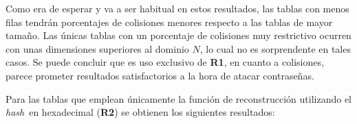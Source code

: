 \documentclass[12pt,spanish,listoffigures,listoftables]{tfgetsinf}
\newcommand{\hash}{\textit{hash}}
\begin{document}
Como era de esperar y va a ser habitual en estos resultados, las tablas con menos filas tendrán porcentajes de colisiones menores respecto a las tablas de mayor tamaño. Las únicas tablas con un porcentaje de colisiones muy restrictivo ocurren con unas dimensiones superiores al dominio $N$, lo cual no es sorprendente en tales casos. Se puede concluir que es uso exclusivo de \textbf{R1}, en cuanto a colisiones, parece prometer resultados satisfactorios a la hora de atacar contraseñas.

Para las tablas que emplean únicamente la función de reconstrucción utilizando el \hash~en hexadecimal (\textbf{R2}) se obtienen los siguientes resultados:
~\\
~\\
~\\
\end{document}
